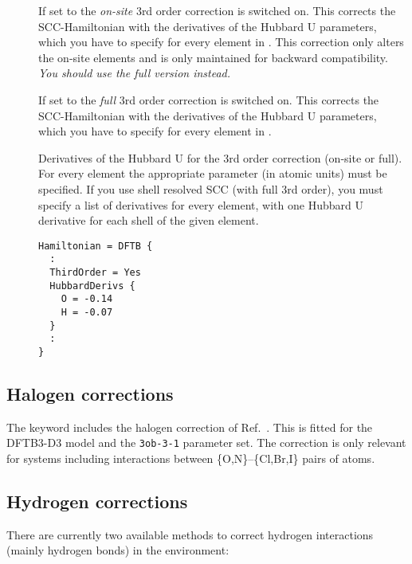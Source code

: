 \begin{description}

\item[] If set to  the \textit{on-site} 3rd order
  correction \cite{yang-JPCA-111-10861} is switched on. This corrects the
  SCC-Hamiltonian with the derivatives of the Hubbard U parameters, which you
  have to specify for every element in . This correction only
  alters the on-site elements and is only maintained for backward
  compatibility. \emph{You should use the full version 
    instead.}

\item[] If set to  the \textit{full} 3rd order
  correction \cite{gauss-jctc-7-931} is switched on. This corrects the
  SCC-Hamiltonian with the derivatives of the Hubbard U parameters, which you
  have to specify for every element in .

\item[] Derivatives of the Hubbard U for the 3rd order
  correction (on-site or full). For every element the appropriate parameter (in
  atomic units) must be specified. If you use shell resolved SCC (with full
  3rd order), you must specify a list of derivatives for every element, with one
  Hubbard U derivative for each shell of the given element.
\begin{verbatim}
Hamiltonian = DFTB {
  :
  ThirdOrder = Yes
  HubbardDerivs {
    O = -0.14
    H = -0.07
  }
  :
}
\end{verbatim}
\end{description}

\subsection{Halogen corrections}
\label{sec:dftbp.xcorr}

The  keyword includes the halogen correction of
Ref.~\cite{kubillus-jctc-11-332}. This is fitted for the DFTB3-D3 model and the
{\tt 3ob-3-1} parameter set. The correction is only relevant for systems
including interactions between \{O,N\}--\{Cl,Br,I\} pairs of atoms.


\subsection{Hydrogen corrections}
\label{sec:dftbp.hcorr}

There are currently two available methods to correct hydrogen interactions
(mainly hydrogen bonds) in the  environment:

